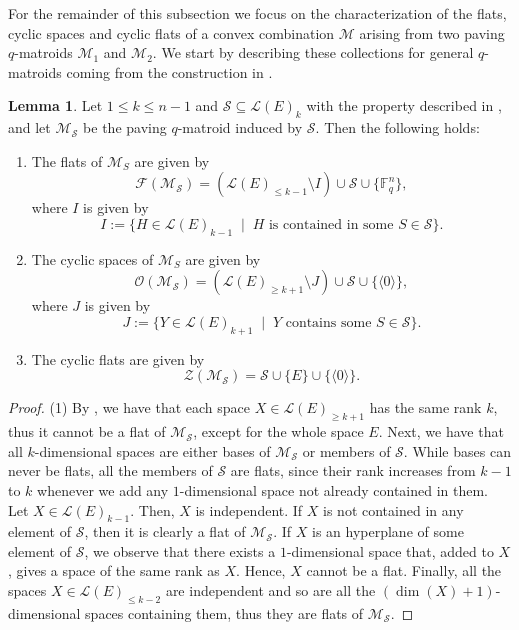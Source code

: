 \documentclass[a4paper,11pt,reqno]{amsart}
\theoremstyle{definition}
\newtheorem{lemma}[theorem]{{{Lemma}}}
\newcommand{\mM}{\mathcal{M}}
\newcommand{\mL}{\mathcal{L}}
\newcommand{\mF}{\mathcal{F}}
\newcommand{\mO}{\mathcal{O}}
\newcommand{\mZ}{\mathcal{Z}}
\newcommand{\mS}{\mathcal{S}}
\newcommand{\F}{\mathbb F}
\begin{document}
{For the remainder of this subsection we focus on the characterization of the flats, cyclic spaces and cyclic flats of a convex combination $\mM$ arising from two paving $q$-matroids $\mM_1$ and $\mM_2$. We start by describing these collections for general $q$-matroids coming from the construction in .

\begin{lemma}\label{lem: flats_cyclic_paving_q_mats}
    Let $1\leq k\leq n-1$ and $\mS\subseteq \mL(E)_{k}$ with the property described in , and let $\mM_\mS$ be the paving $q$-matroid induced by $\mS$. Then the following holds:
    \begin{enumerate}
        \item The flats of $\mM_S$ are given by
        \[
            \mF(\mM_{\mS})=(\mL(E)_{\leq k-1}\setminus I)\cup \mS\cup\{\F_q^n\},
        \]
        where $I$ is given by
        \[
            I:=\{H\in\mL(E)_{k-1}\;\mid\; H \text{ is contained in some } S\in\mS\}.
        \]
        
        \item The cyclic spaces of $\mM_S$ are given by 
        \[
            \mO(\mM_{\mS})=(\mL(E)_{\geq k+1}\setminus J)\cup \mS\cup\{\langle 0\rangle\},
        \]
        where $J$ is given by
        \[
            J:=\{Y\in\mL(E)_{k+1}\;\mid\; Y \text{ contains some } S\in\mS\}.
        \]
        
        \item The cyclic flats are given by
        \[
            \mZ(\mM_{\mS})= \mS\cup\{E\}\cup\{\langle 0\rangle\}.
        \]
    \end{enumerate}
\end{lemma}
\begin{proof}
    (1) By , we have that each space $X\in\mL(E)_{\geq k+1}$  has the same rank $k$, thus it cannot be a flat of $\mM_{\mS}$, except for the whole space $E$. Next, we have that all $k$-dimensional spaces are either bases of $\mM_{\mS}$ or members of $\mS$. While bases can never be flats, all the members of $\mS$ are flats, since their rank increases from $k-1$ to $k$ whenever we add any  $1$-dimensional space not already contained in them. Let $X\in\mL(E)_{k-1}$. Then, $X$ is independent. 
    If $X$ is not contained in any element of $\mS$, then it is clearly a flat of $\mM_{\mS}$. If $X$ is an hyperplane of some element of $\mS$, we observe that there exists a $1$-dimensional space that, added to $X$, gives a space of the same rank as $X$. Hence, $X$ cannot be a flat. Finally, all the spaces $X\in\mL(E)_{\leq k-2}$ are independent and so are all the $(\dim(X)+1)$-dimensional spaces containing them, thus they are flats of $\mM_{\mS}$. 


\end{proof}}
\end{document}

